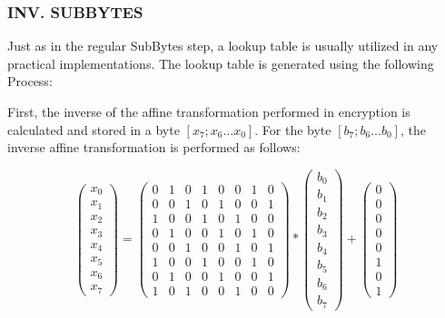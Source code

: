 \documentclass[12pt]{report}
\theoremstyle{definition}
\theoremstyle{remark}
\begin{document}
\subsubsection{INV. SUBBYTES}
Just as in the regular SubBytes step, a lookup table is usually utilized in any practical implementations. The lookup table is generated using the following Process:

First, the inverse of the affine transformation performed in encryption is calculated and stored in a byte $[x_7;x_6...x_0]$. For the byte $[b_7;b_6...b_0]$, the inverse affine transformation is performed as follows:

\[ 
\left( \begin{array}{c}
x_0 \\
x_1 \\
x_2 \\
x_3 \\
x_4 \\
x_5 \\
x_6 \\
x_7\end{array} \right)
=
\left( \begin{array}{cccccccc}
0 & 1 & 0 & 1 & 0 & 0 & 1 & 0 \\
0 & 0 & 1 & 0 & 1 & 0 & 0 & 1 \\
1 & 0 & 0 & 1 & 0 & 1 & 0 & 0 \\
0 & 1 & 0 & 0 & 1 & 0 & 1 & 0 \\
0 & 0 & 1 & 0 & 0 & 1 & 0 & 1 \\
1 & 0 & 0 & 1 & 0 & 0 & 1 & 0 \\
0 & 1 & 0 & 0 & 1 & 0 & 0 & 1 \\
1 & 0 & 1 & 0 & 0 & 1 & 0 & 0\end{array} \right)
*
\left( \begin{array}{c}
b_0 \\
b_1 \\
b_2 \\
b_3 \\
b_4 \\
b_5 \\
b_6 \\
b_7\end{array} \right)
+
\left( \begin{array}{c}
0 \\
0 \\
0 \\
0 \\
0 \\
1 \\
0 \\
1\end{array} \right)
\]
\end{document}
